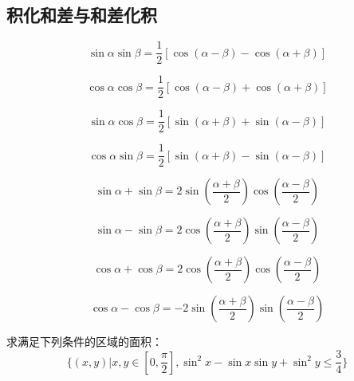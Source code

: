 \subsection{积化和差与和差化积}
\begin{theorem}
    \begin{equation}
        \sin\alpha \sin\beta = \frac{1}{2}[\cos(\alpha - \beta) - \cos(\alpha + \beta)]
    \end{equation}
        
    \begin{equation}
        \cos\alpha \cos\beta = \frac{1}{2}[\cos(\alpha - \beta) + \cos(\alpha + \beta)]
    \end{equation}
        
    \begin{equation}
        \sin\alpha \cos\beta = \frac{1}{2}[\sin(\alpha + \beta) + \sin(\alpha - \beta)]
    \end{equation}
        
    \begin{equation}
        \cos\alpha \sin\beta =\frac{1}{2} [\sin(\alpha + \beta) - \sin(\alpha - \beta)]
    \end{equation}
\end{theorem}
\begin{theorem}
    

    \begin{equation}
        \sin\alpha + \sin\beta = 2 \sin\left(\frac{\alpha + \beta}{2}\right) \cos\left(\frac{\alpha - \beta}{2}\right)
    \end{equation}
        
    \begin{equation}
        \sin\alpha - \sin\beta = 2 \cos\left(\frac{\alpha + \beta}{2}\right) \sin\left(\frac{\alpha - \beta}{2}\right)
    \end{equation}
        
    \begin{equation}
        \cos\alpha + \cos\beta = 2 \cos\left(\frac{\alpha + \beta}{2}\right) \cos\left(\frac{\alpha - \beta}{2}\right)
    \end{equation}
        
    \begin{equation}
        \cos\alpha - \cos\beta = -2 \sin\left(\frac{\alpha + \beta}{2}\right) \sin\left(\frac{\alpha - \beta}{2}\right)
    \end{equation}
\end{theorem}

\begin{example}
    求满足下列条件的区域的面积：
    \[\{(x,y)|x,y\in[0,\frac{\pi }{2}],\sin ^2 x-\sin x \sin y+\sin ^2y\leq\frac{3}{4}\}\]
\end{example}

